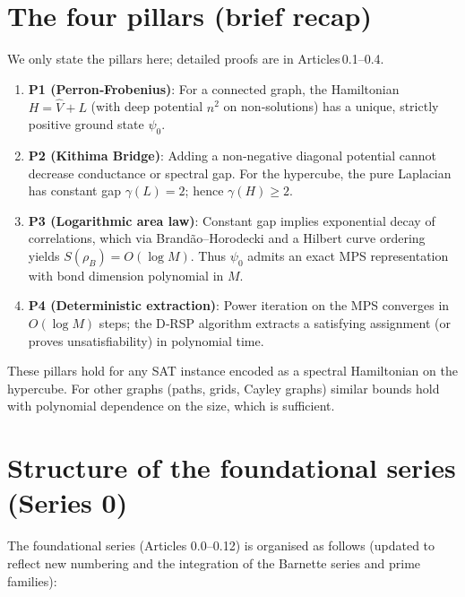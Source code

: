 \documentclass[11pt,a4paper]{article}
\begin{document}
\section{The four pillars (brief recap)}

We only state the pillars here; detailed proofs are in Articles 0.1–0.4.

\begin{enumerate}
\item \textbf{P1 (Perron‑Frobenius)}: For a connected graph, the Hamiltonian \(H = \hat{V} + L\) (with deep potential \(n^2\) on non‑solutions) has a unique, strictly positive ground state \(\psi_0\).
\item \textbf{P2 (Kithima Bridge)}: Adding a non‑negative diagonal potential cannot decrease conductance or spectral gap. For the hypercube, the pure Laplacian has constant gap \(\gamma(L)=2\); hence \(\gamma(H)\ge 2\).
\item \textbf{P3 (Logarithmic area law)}: Constant gap implies exponential decay of correlations, which via Brandão–Horodecki and a Hilbert curve ordering yields \(S(\rho_B)=O(\log M)\). Thus \(\psi_0\) admits an exact MPS representation with bond dimension polynomial in \(M\).
\item \textbf{P4 (Deterministic extraction)}: Power iteration on the MPS converges in \(O(\log M)\) steps; the D‑RSP algorithm extracts a satisfying assignment (or proves unsatisfiability) in polynomial time.
\end{enumerate}

These pillars hold for any SAT instance encoded as a spectral Hamiltonian on the hypercube. For other graphs (paths, grids, Cayley graphs) similar bounds hold with polynomial dependence on the size, which is sufficient.

\section{Structure of the foundational series (Series 0)}

The foundational series (Articles 0.0–0.12) is organised as follows (updated to reflect new numbering and the integration of the Barnette series and prime families):
\end{document}
